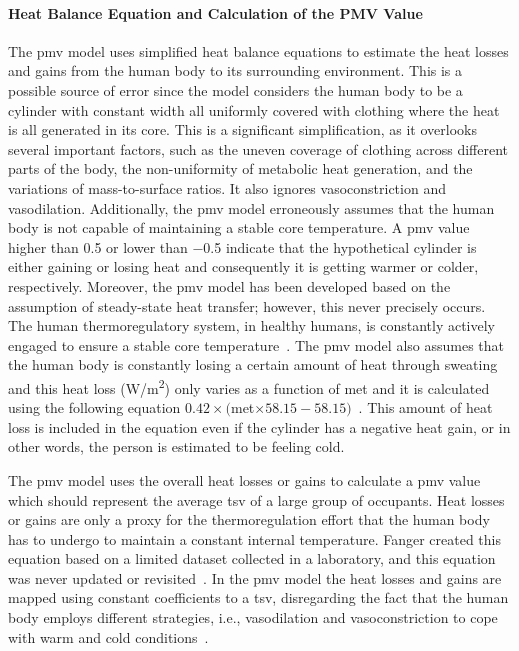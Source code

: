 \paragraph{Heat Balance Equation and Calculation of the PMV Value}
The \ac{pmv} model uses simplified heat balance equations to estimate the heat losses and gains from the human body to its surrounding environment.
This is a possible source of error since the model considers the human body to be a cylinder with constant width all uniformly covered with clothing where the heat is all generated in its core.
This is a significant simplification, as it overlooks several important factors, such as the uneven coverage of clothing across different parts of the body, the non-uniformity of metabolic heat generation, and the variations of mass-to-surface ratios.
It also ignores vasoconstriction and vasodilation.
Additionally, the \ac{pmv} model erroneously assumes that the human body is not capable of maintaining a stable core temperature.
A \ac{pmv} value higher than \num{.5} or lower than \num{-.5} indicate that the hypothetical cylinder is either gaining or losing heat and consequently it is getting warmer or colder, respectively.
Moreover, the \ac{pmv} model has been developed based on the assumption of steady-state heat transfer; however, this never precisely occurs.
The human thermoregulatory system, in healthy humans, is constantly actively engaged to ensure a stable core temperature~\cite{romanovsky_thermoregulation_2018}.
The \ac{pmv} model also assumes that the human body is constantly losing a certain amount of heat through sweating and this heat loss (W/m\textsuperscript{2}) only varies as a function of \ac{met} and it is calculated using the following equation $0.42\times($\ac{met}$\times58.15 - 58.15)$~\cite{Fanger1970}.
This amount of heat loss is included in the equation even if the cylinder has a negative heat gain, or in other words, the person is estimated to be feeling cold.

The \ac{pmv} model uses the overall heat losses or gains to calculate a \ac{pmv} value which should represent the average \ac{tsv} of a large group of occupants.
Heat losses or gains are only a proxy for the thermoregulation effort that the human body has to undergo to maintain a constant internal temperature.
Fanger created this equation based on a limited dataset collected in a laboratory, and this equation was never updated or revisited~\cite{Fanger1970}.
In the \ac{pmv} model the heat losses and gains are mapped using constant coefficients to a \ac{tsv}, disregarding the fact that the human body employs different strategies, i.e., vasodilation and vasoconstriction to cope with warm and cold conditions~\cite{romanovsky_thermoregulation_2018}.

